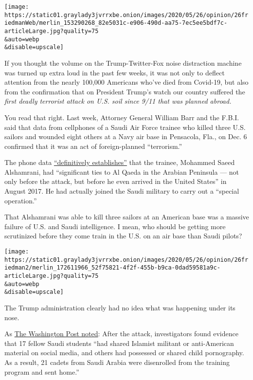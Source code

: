 \texttt{[image: https://static01.graylady3jvrrxbe.onion/images/2020/05/26/opinion/26friedmanWeb/merlin\_153290268\_82e5031c-e906-490d-aa75-7ec5ee5bdf7c-articleLarge.jpg?quality=75\\\&auto=webp\\\&disable=upscale]}

If you thought the volume on the Trump-Twitter-Fox noise distraction
machine was turned up extra loud in the past few weeks, it was not only
to deflect attention from the nearly 100,000 Americans who've died from
Covid-19, but also from the confirmation that on President Trump's watch
our country suffered the \emph{first deadly terrorist attack on U.S.
soil since 9/11 that was planned abroad.}

You read that right. Last week, Attorney General William Barr and the
F.B.I. said that data from cellphones of a Saudi Air Force trainee who
killed three U.S. sailors and wounded eight others at a Navy air base in
Pensacola, Fla., on Dec. 6 confirmed that it was an act of
foreign-planned ``terrorism.''

The phone data
\href{https://www.justice.gov/opa/pr/attorney-general-william-p-barr-and-fbi-director-christopher-wray-announce-significant}{``definitively
establishes''} that the trainee, Mohammed Saeed Alshamrani, had
``significant ties to Al Qaeda in the Arabian Peninsula --- not only
before the attack, but before he even arrived in the United States'' in
August 2017. He had actually joined the Saudi military to carry out a
``special operation.''

That Alshamrani was able to kill three sailors at an American base was a
massive failure of U.S. and Saudi intelligence. I mean, who should be
getting more scrutinized before they come train in the U.S. on an air
base than Saudi pilots?

\texttt{[image: https://static01.graylady3jvrrxbe.onion/images/2020/05/26/opinion/26friedman2/merlin\_172611966\_52f75821-4f2f-455b-b9ca-0dad59581a9c-articleLarge.jpg?quality=75\\\&auto=webp\\\&disable=upscale]}

The Trump administration clearly had no idea what was happening under
its nose.

As
\href{https://www.washingtonpost.com/national-security/fbi-links-al-qaeda-to-saudi-gunman-who-killed-three-us-sailors-in-pensacola-last-year/2020/05/18/b34e3f7a-990f-11ea-89fd-28fb313d1886_story.html}{The
Washington Post noted}: After the attack, investigators found evidence
that 17 fellow Saudi students ``had shared Islamist militant or
anti-American material on social media, and others had possessed or
shared child pornography. As a result, 21 cadets from Saudi Arabia were
disenrolled from the training program and sent home.''

